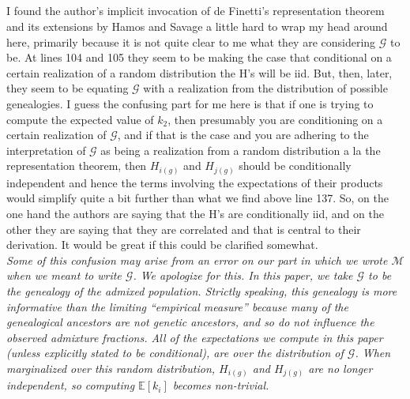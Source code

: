 \documentclass[11pt]{amsart}
\begin{document}
\subsection{}
I found the author's implicit invocation of de Finetti's representation theorem
and its extensions by Hamos and Savage a little hard to wrap my head around
here, primarily because it is not quite clear to me what they are considering
$\mathcal{G}$ to be. At lines 104 and 105 they seem to be making the case that
conditional on a certain realization of a random distribution the H's will be
iid. But, then, later, they seem to be equating $\mathcal{G}$ with a realization
from the distribution of possible genealogies. I guess the confusing part for me
here is that if one is trying to compute the expected value of $k_2$, then
presumably you are conditioning on a certain realization of $\mathcal{G}$, and
if that is the case and you are adhering to the interpretation of $\mathcal{G}$
as being a realization from a random distribution a la the representation
theorem, then $H_{i(g)}$ and $H_{j(g)}$ should be conditionally independent and
hence the terms involving the expectations of their products would simplify
quite a bit further than what we find above line 137. So, on the one hand the
authors are saying that the H's are conditionally iid, and on the other they are
saying that they are correlated and that is central to their derivation. It
would be great if this could be clarified somewhat.\\
\textit{
	Some of this confusion may arise from an error on our part in which we wrote
	$\mathcal{M}$ when we meant to write $\mathcal{G}$. We apologize for this. In
	this paper, we take $\mathcal{G}$ to be the genealogy of the admixed
	population. Strictly speaking, this genealogy is more informative than the
	limiting ``empirical measure'' because many of the genealogical ancestors are
	not genetic ancestors, and so do not influence the observed admixture
	fractions. All of the expectations we compute in this paper (unless explicitly
	stated to be conditional), are over the distribution of $\mathcal{G}$. When
	marginalized over this random distribution, $H_{i(g)}$ and $H_{j(g)}$ are no
	longer independent, so computing $\mathbb{E}[k_i]$ becomes non-trivial.
}
\end{document}
